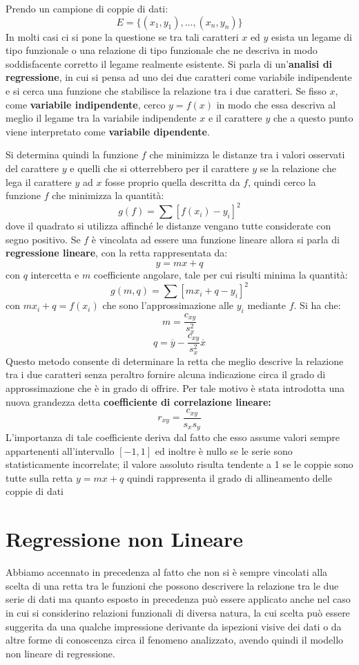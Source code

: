 \documentclass[a4paper,12pt, oneside]{book}
\begin{document}
Prendo un campione di coppie di dati:
\[ E = \{(x_1,y_1), \dots, (x_n,y_n)\} \]
In molti casi ci si pone la questione se tra tali caratteri $x$ ed $y$ esista un legame di tipo funzionale
o una relazione di tipo funzionale che ne descriva in modo soddisfacente corretto il legame realmente esistente.\newline
Si parla di un'\textbf{analisi di regressione}, in cui si pensa ad uno dei due caratteri come variabile indipendente e
si cerca una funzione che stabilisce la relazione tra i due caratteri.\newline
Se fisso $x$, come \textbf{variabile indipendente}, cerco $y = f(x)$ in modo che essa descriva al meglio
il legame tra la variabile indipendente $x$ e il carattere $y$ che a questo punto viene interpretato come \textbf{variabile dipendente}.

Si determina quindi la funzione $f$ che minimizza le distanze tra i valori osservati del carattere $y$
e quelli che si otterrebbero per il carattere $y$ se la relazione che lega il carattere $y$ ad $x$ 
fosse proprio quella descritta da $f$, quindi cerco la funzione $f$ che minimizza la quantità:
\[ g(f) = \sum[f(x_i)-y_i]^2 \]
dove il quadrato si utilizza affinché le distanze vengano tutte considerate con segno positivo.\newline
Se $f$ è vincolata ad essere una funzione lineare allora si parla di \textbf{regressione lineare}, con la retta rappresentata da:
\[ y=mx+q \]
con $q$ intercetta e $m$ coefficiente angolare, tale per cui risulti minima la quantità:
\[ g(m,q) = \sum[mx_i+q-y_i]^2 \]
con $mx_i+q=f(x_i)$ che sono l'approssimazione alle $y_i$ mediante $f$. Si ha che:
\[ m = \frac{c_{xy}}{s^2_x} \]
\[ q = \overline{y} - \frac{c_{xy}}{s_x^2}\overline{x} \]
Questo metodo consente di determinare la retta che meglio descrive la relazione tra i due caratteri 
senza peraltro fornire alcuna indicazione circa il grado di approssimazione che è in grado di offrire.\newline
Per tale motivo è stata introdotta una nuova grandezza detta \textbf{coefficiente di correlazione lineare:}
\[ r_{xy}=\frac{c_{xy}}{s_xs_y} \]
L'importanza di tale coefficiente deriva dal fatto che esso assume valori sempre appartenenti all'intervallo $[-1, 1]$ 
ed inoltre è nullo se le serie sono statisticamente incorrelate; il valore assoluto risulta tendente a 1
se le coppie sono tutte sulla retta $y=mx+q$ quindi rappresenta il grado di allineamento delle coppie di dati

\section{Regressione non Lineare}
Abbiamo accennato in precedenza al fatto che non si è sempre vincolati alla scelta di una retta tra le funzioni
che possono descrivere la relazione tra le due serie di dati ma quanto esposto in precedenza può essere applicato 
anche nel caso in cui si considerino relazioni funzionali di diversa natura, la cui scelta può essere suggerita
da una qualche impressione derivante da ispezioni visive dei dati o da altre forme di conoscenza circa il fenomeno analizzato,
avendo quindi il modello non lineare di regressione.
\end{document}
